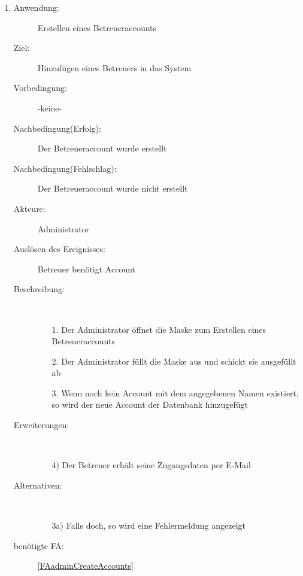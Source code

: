 \documentclass[parskip=full]{scrartcl}
\newcommand{\swtLabel}[1]{\textbf{/#1\arabic*0/}}
\begin{document}
\begin{enumerate} [label=\swtLabel{A}]
  \item \label{UCadminCreateBetreuer}
  \begin{description}
  \item[Anwendung:] Erstellen eines Betreueraccounts
  \item[Ziel:] Hinzufügen eines Betreuers in das System
  	\item[Vorbedingung:] -keine-
  	\item[Nachbedingung(Erfolg):] Der Betreueraccount wurde erstellt
  	\item[Nachbedingung(Fehlschlag):] Der Betreueraccount wurde nicht erstellt
  	\item[Akteure:] Administrator
  	\item[Auslösen des Ereignisses:] Betreuer benötigt Account
  	\item[Beschreibung:]~
  	 \begin{enumerate} 
  	   \item[1.] Der Administrator öffnet die Maske zum Erstellen eines
  	   Betreueraccounts  
  	   \item[2.] Der Administrator füllt die Maske aus und schickt sie ausgefüllt
  	   ab
  	   \item[3.] Wenn noch kein Account mit dem angegebenen Namen existiert, so
  	   wird der neue Account der Datenbank hinzugefügt
  	 \end{enumerate} 
  	\item[Erweiterungen:]~
  	 \begin{enumerate}
  	   \item[4)] Der Betreuer erhält seine Zugangsdaten per E-Mail
  	 \end{enumerate}  
  	\item[Alternativen:] ~
  	 \begin{enumerate}
  	  \item[3a)] Falls doch, so wird eine Fehlermeldung angezeigt
  	 \end{enumerate}  
  	 \item[benötigte FA:] \ref{FAadminCreateAccounts}
  \end{description}
  

\end{enumerate}
\end{document}

